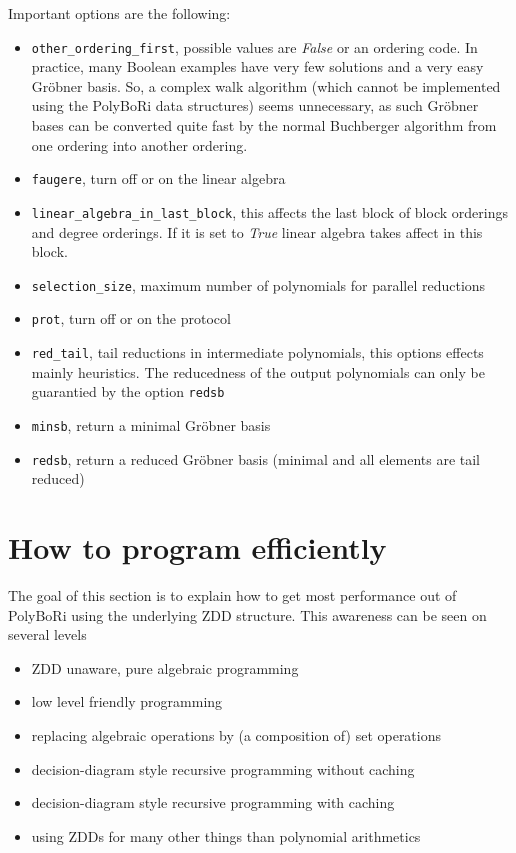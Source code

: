 \documentclass[]{article}
\newcommand{\PolyBoRi}{{\sc PolyBoRi}\xspace}
\newcommand{\Groebner}{Gröbner\xspace}
\newcommand{\pythonconstant}[1]{\textit{#1}\xspace}
\newcounter{thm}
\begin{document}
Important options are the following:
\begin{itemize}
    \item \verb|other_ordering_first|, possible values are \pythonconstant{False} or an ordering code.
    In practice, many Boolean examples have very few solutions and a very easy \Groebner basis. So, a complex walk algorithm (which cannot be implemented using the \PolyBoRi data structures) seems unnecessary, as such \Groebner bases can be converted quite fast by the 
    normal Buchberger algorithm from one ordering into another ordering.
    \item \verb|faugere|, turn off or on the linear algebra
    \item \verb|linear_algebra_in_last_block|, this affects the last block of block orderings and degree orderings. If it is set to \pythonconstant{True} linear algebra takes affect in this block.
    \item \verb|selection_size|, maximum number of polynomials for parallel reductions
    \item \verb|prot|, turn off or on the protocol
    \item \verb|red_tail|, tail reductions in intermediate polynomials, this options effects mainly heuristics. The reducedness of the output polynomials can only be guarantied by the option \verb|redsb|
    \item \verb|minsb|, return a minimal \Groebner basis
    \item \verb|redsb|, return a reduced \Groebner basis (minimal and all elements are tail reduced)
\end{itemize}
\section{How to program efficiently}
The goal of this section is to explain how to get most performance out of \PolyBoRi using the underlying ZDD structure.
This awareness can be seen on several levels
\begin{itemize}
    \item ZDD unaware, pure algebraic programming 
    \item low level friendly programming
    \item replacing algebraic operations by (a composition of) set operations
    \item decision-diagram style recursive programming without caching
    \item decision-diagram style recursive programming with caching
    \item using ZDDs for many other things than polynomial arithmetics
\end{itemize}
\end{document}

